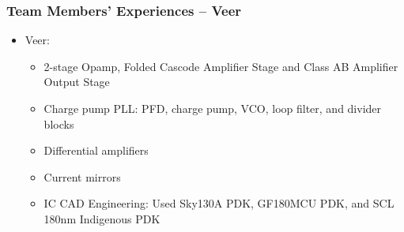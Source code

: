 \documentclass[xcolor={usenames,dvipsnames},hyperref={hyperindex,bookmarks}]{beamer}
\begin{document}
\begin{frame}
	\frametitle{Team Members' Experiences -- Veer}
	
	
	\begin{itemize}
	\item Veer: %
		\begin{itemize} %
		\item 2-stage Opamp, Folded Cascode Amplifier Stage and Class AB Amplifier Output Stage
		\item Charge pump PLL: PFD, charge pump, VCO, loop filter, and divider blocks
		\item Differential amplifiers
		\item Current mirrors
		\item IC CAD Engineering: Used Sky130A PDK, GF180MCU PDK, and SCL 180nm Indigenous PDK
		\end{itemize}
	\end{itemize}
	
\end{frame}
\end{document}
